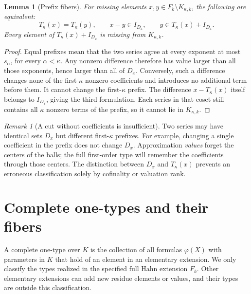 \documentclass[11pt,letterpaper]{article}
\numberwithin{equation}{section}
\newtheorem{lemma}[theorem]{Lemma}
\theoremstyle{definition}
\theoremstyle{remark}
\newtheorem{remark}[theorem]{Remark}
\newcommand{\K}{K_{\kappa,k}}
\begin{document}
\begin{lemma}[Prefix fibers]\label{fkc:lem:fibers}
For missing elements $x,y\in F_k\setminus\K$, the following are equivalent:
\[
 T_\kappa(x)=T_\kappa(y),\qquad x-y\in I_{D_x},\qquad
 y\in T_\kappa(x)+I_{D_x}.
\]
Every element of $T_\kappa(x)+I_{D_x}$ is missing from $\K$.
\end{lemma}
\begin{proof}
Equal prefixes mean that the two series agree at every exponent at most $s_\alpha$, for every $\alpha<\kappa$. Any nonzero difference therefore has value larger than all those exponents, hence larger than all of $D_x$. Conversely, such a difference changes none of the first $\kappa$ nonzero coefficients and introduces no additional term before them. It cannot change the first-$\kappa$ prefix. The difference $x-T_\kappa(x)$ itself belongs to $I_{D_x}$, giving the third formulation. Each series in that coset still contains all $\kappa$ nonzero terms of the prefix, so it cannot lie in $\K$.
\end{proof}

\begin{remark}[A cut without coefficients is insufficient]
Two series may have identical sets $D_x$ but different first-$\kappa$ prefixes. For example, changing a single coefficient in the prefix does not change $D_x$. Approximation \emph{values} forget the centers of the balls; the full first-order type will remember the coefficients through those centers. The distinction between $D_x$ and $T_\kappa(x)$ prevents an erroneous classification solely by cofinality or valuation rank.
\end{remark}

\section{Complete one-types and their fibers}
\label{fkc:sec:types}

A complete one-type over $K$ is the collection of all formulas $\varphi(X)$ with parameters in $K$ that hold of an element in an elementary extension. We only classify the types realized in the specified full Hahn extension $F_k$. Other elementary extensions can add new residue elements or values, and their types are outside this classification.
\end{document}
